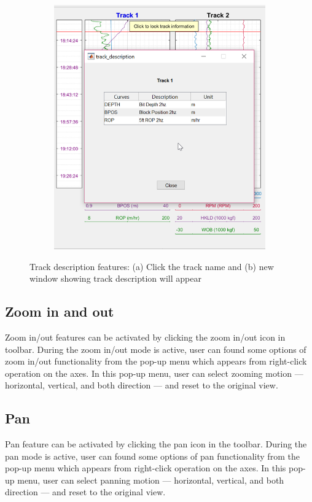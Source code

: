 \documentclass[12pt,a4paper,oneside]{report}
\begin{document}
\begin{figure}[H]
\begin{subfigure}[b]{0.55\textwidth}
    \includegraphics[width=\textwidth]{track_des_2.png}
    \caption{}
  \end{subfigure}
  \caption{Track description features: (a) Click the track name and (b) new window showing track description will appear}
  
\end{figure}



\subsection{Zoom in and out}
Zoom in/out features can be activated by clicking the zoom in/out icon in toolbar. During the zoom in/out mode is active, user can found some options of zoom in/out functionality from the pop-up menu which appears from right-click operation on the axes. In this pop-up menu, user can select zooming motion --- horizontal, vertical, and both direction --- and reset to the original view.

\subsection{Pan}
Pan feature can be activated by clicking the pan icon in the toolbar. During the pan mode is active, user can found some options of pan functionality from the pop-up menu which appears from right-click operation on the axes. In this pop-up menu, user can select panning motion --- horizontal, vertical, and both direction --- and reset to the original view.
\end{document}
